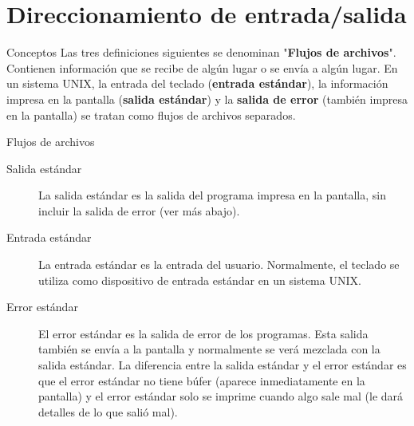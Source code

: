 \section{Direccionamiento de entrada/salida}

\begin{frame}[c]{Conceptos}
  Las tres definiciones siguientes se denominan "\textbf{Flujos de archivos}".
  Contienen información que se recibe de algún lugar o se envía a algún lugar.
  En un sistema UNIX, la entrada del teclado (\textbf{entrada estándar}),
  la información impresa en la pantalla (\textbf{salida estándar}) y la
  \textbf{salida de error} (también impresa en la pantalla) se tratan como
  flujos de archivos separados.
\end{frame}

\begin{frame}[c]{Flujos de archivos}
  \begin{description}
    \item[Salida estándar] 
      La salida estándar es la salida del programa impresa en la pantalla,
      sin incluir la salida de error (ver más abajo).
    \pausa
    \vspace{\baselineskip}
    \item[Entrada estándar]
      La entrada estándar es la entrada del usuario. Normalmente, el teclado
      se utiliza como dispositivo de entrada estándar en un sistema UNIX.
    \pausa
    \vspace{\baselineskip}
    \item[Error estándar]
      El error estándar es la salida de error de los programas. Esta salida
      también se envía a la pantalla y normalmente se verá mezclada con la
      salida estándar. La diferencia entre la salida estándar y el error
      estándar es que el error estándar no tiene búfer (aparece
      inmediatamente en la pantalla) y el error estándar solo se imprime
      cuando algo sale mal (le dará detalles de lo que salió mal).
  \end{description}
\end{frame}

